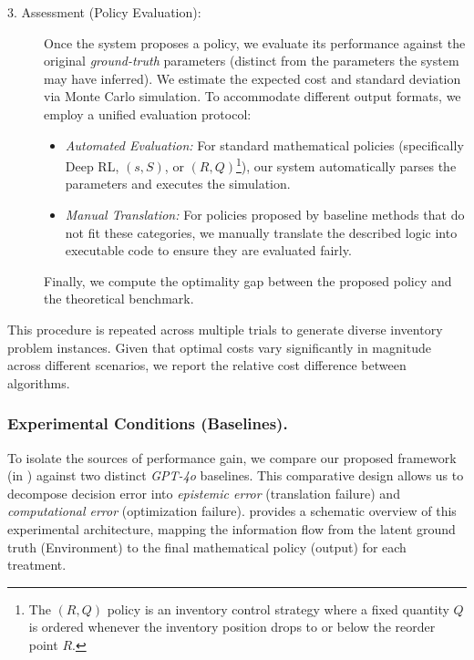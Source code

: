\begin{description}
    \item[3. Assessment (Policy Evaluation):]
    Once the system proposes a policy, we evaluate its performance against the original \textit{ground-truth} parameters (distinct from the parameters the system may have inferred). We estimate the expected cost and standard deviation via Monte Carlo simulation.
    To accommodate different output formats, we employ a unified evaluation protocol: 
    \begin{itemize}[label=-]
        \item \emph{Automated Evaluation:} For standard mathematical policies (specifically Deep RL, $(s, S)$, or $(R, Q)$\footnote{The $(R, Q)$ policy is an inventory control strategy where a fixed quantity $Q$ is ordered whenever the inventory position drops to or below the reorder point $R$.}), our system automatically parses the parameters and executes the simulation.
        \item \emph{Manual Translation:} For policies proposed by baseline methods that do not fit these categories, we manually translate the described logic into executable code to ensure they are evaluated fairly.
    \end{itemize}
    Finally, we compute the optimality gap between the proposed policy and the theoretical benchmark.
\end{description}

This procedure is repeated across multiple trials to generate diverse inventory problem instances. Given that optimal costs vary significantly in magnitude across different scenarios, we report the relative cost difference between algorithms.

\subsubsection{Experimental Conditions (Baselines).}\label{sec:benchmarks}
To isolate the sources of performance gain, we compare our proposed framework (in ) against two distinct \emph{GPT-4o} baselines. This comparative design allows us to decompose decision error into \textit{epistemic error} (translation failure) and \textit{computational error} (optimization failure).
 provides a schematic overview of this experimental architecture, mapping the information flow from the latent ground truth (Environment) to the final mathematical policy (output) for each treatment.







